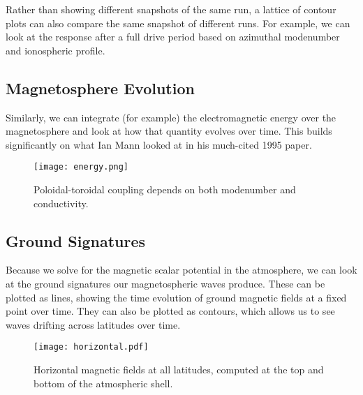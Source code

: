 \documentclass{article}
\begin{document}
Rather than showing different snapshots of the same run, a lattice of contour plots can also compare the same snapshot of different runs. For example, we can look at the response after a full drive period based on azimuthal modenumber and ionospheric profile. 

\subsection{Magnetosphere Evolution}

Similarly, we can integrate (for example) the electromagnetic energy over the magnetosphere and look at how that quantity evolves over time. This builds significantly on what Ian Mann looked at in his much-cited 1995 paper. 
\begin{figure}[H]
  \texttt{[image: energy.png]}
  \caption{Poloidal-toroidal coupling depends on both modenumber and conductivity. }
\end{figure}

\subsection{Ground Signatures}

Because we solve for the magnetic scalar potential in the atmosphere, we can look at the ground signatures our magnetospheric waves produce. These can be plotted as lines, showing the time evolution of ground magnetic fields at a fixed point over time. They can also be plotted as contours, which allows us to see waves drifting across latitudes over time. 
\begin{figure}[H]
  \texttt{[image: horizontal.pdf]}
  \caption{Horizontal magnetic fields at all latitudes, computed at the top and bottom of the atmospheric shell. }
\end{figure}
\end{document}
